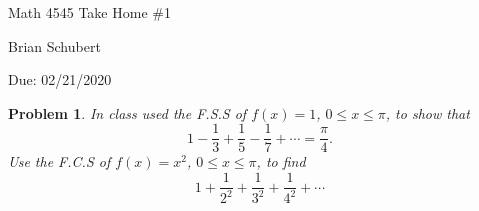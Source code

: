 \documentclass[a4paper,12pt]{article} %
\theoremstyle{plain}
\newtheorem{problem}{Problem}
\begin{document}
\begin{center}
    \huge
    Math 4545 Take Home \#1

    \vspace{0.5cm}
    \large
    Brian Schubert

    \vspace{0.5cm}
    Due: 02/21/2020
\end{center}

\begin{problem}
    In class used the F.S.S of $f(x)=1$, $0 \leq x \leq \pi$,
    to show that \begin{equation*}
     1-\frac{1}{3}+\frac{1}{5}-\frac{1}{7}+\cdots = \frac{\pi}{4}.
     \end{equation*} 
     Use the F.C.S of $f(x)=x^2$, $0\leq x \leq \pi$, to find \begin{equation*}
        1 + \frac{1}{2^2} + \frac{1}{3^2} + \frac{1}{4^2} + \cdots
     \end{equation*}
\end{problem}
\end{document}
